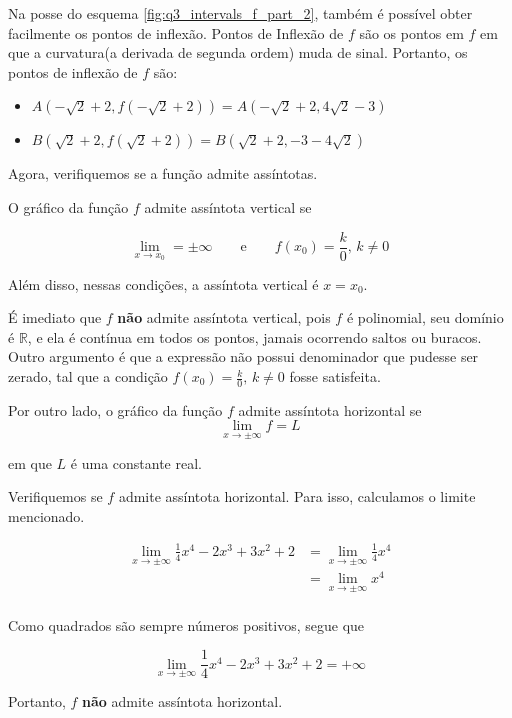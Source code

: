 \documentclass{article}
\begin{document}
Na posse do esquema \ref{fig:q3_intervals_f_part_2}, também é possível obter
facilmente os pontos de inflexão.
Pontos de Inflexão de \(f\) são os pontos em \(f\) em que a curvatura(a derivada de segunda ordem)
muda de sinal.
Portanto, os pontos de inflexão de \(f\) são:
\begin{itemize}
    \item \(A(-\sqrt{2} + 2, f(-\sqrt{2} + 2)) = A(-\sqrt{2} + 2, 4\sqrt{2} - 3)\)
    \item \(B(\sqrt{2} + 2, f(\sqrt{2} + 2)) = B(\sqrt{2} + 2, -3-4\sqrt{2}) \)
\end{itemize}

Agora, verifiquemos se a função admite assíntotas.

O gráfico da função \(f\) admite assíntota vertical se

\[
    \lim_{x\to x_0} = \pm \infty
    \qquad \mbox{e} \qquad
    f(x_0) = \frac{k}{0} \mbox{, } k \neq 0
\]

Além disso, nessas condições, a assíntota vertical é \(x = x_0\).

É imediato que \(f\) \textbf{não} admite assíntota vertical, pois \(f\) é
polinomial, seu domínio é \(\mathbb{R}\), e ela é contínua em todos
os pontos, jamais ocorrendo saltos ou buracos.
Outro argumento é que a expressão não possui denominador que pudesse ser zerado, tal que a condição
\(f(x_0) = \frac{k}{0} \mbox{, } k \neq 0\) fosse satisfeita.

Por outro lado, o gráfico da função \(f\) admite assíntota horizontal se
\[
    \lim_{x\to \pm \infty} f = L
\]

em que \(L\) é uma constante real.

Verifiquemos se \(f\) admite assíntota horizontal.
Para isso, calculamos o limite mencionado.

\begin{align*}
    \lim_{x\to \pm \infty} \frac{1}{4}x^4-2x^3+3x^2+2
    &=
    \lim_{x\to \pm \infty} \frac{1}{4}x^4 \\
    &=
    \lim_{x\to \pm \infty} x^4 \\
\end{align*}

Como quadrados são sempre números positivos, segue que 

\begin{equation}
    \lim_{x\to \pm \infty} \frac{1}{4}x^4-2x^3+3x^2+2 = +\infty
\end{equation}

Portanto, \(f\) \textbf{não} admite assíntota horizontal.
\end{document}
